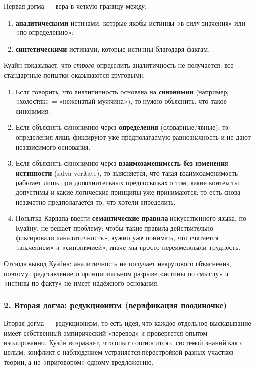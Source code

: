 \documentclass[a4paper,12pt]{article}
\begin{document}
Первая догма --- вера в чёткую границу между:
\begin{enumerate}
    \item \textbf{аналитическими} истинами, которые якобы истинны «в силу значения» или «по определению»;
    \item \textbf{синтетическими} истинами, которые истинны благодаря фактам.
\end{enumerate}

Куайн показывает, что \emph{строго} определить аналитичность не получается: все стандартные попытки оказываются круговыми.
\begin{enumerate}
    \item Если говорить, что аналитичность основана на \textbf{синонимии} (например, «холостяк» = «неженатый мужчина»), то нужно объяснить, что такое синонимия.
    \item Если объяснять синонимию через \textbf{определения} (словарные/явные), то определения лишь фиксируют уже предполагаемую равнозначность и не дают независимого основания.
    \item Если объяснять синонимию через \textbf{взаимозаменимость без изменения истинности} (salva veritate), то выясняется, что такая взаимозаменимость работает лишь при дополнительных предпосылках о том, какие контексты допустимы и какие логические принципы уже принимаются; то есть снова незаметно предполагается то, что хотели определить.
    \item Попытка Карнапа ввести \textbf{семантические правила} искусственного языка, по Куайну, не решает проблему: чтобы такие правила действительно фиксировали «аналитичность», нужно уже понимать, что считается «значением» и «синонимией», иначе мы просто переименовали трудность.
\end{enumerate}

Отсюда вывод Куайна: аналитичность не получает некругового объяснения, поэтому представление о принципиальном разрыве «истины по смыслу» и «истины по факту» не имеет надёжного основания.

\subsubsection*{2. Вторая догма: редукционизм (верификация поодиночке)}

Вторая догма --- редукционизм, то есть идея, что каждое отдельное высказывание имеет собственный эмпирический «перевод» и проверяется опытом изолированно. Куайн возражает, что опыт соотносится с системой знаний как с целым: конфликт с наблюдением устраняется перестройкой разных участков теории, а не «приговором» одному предложению.
\end{document}
